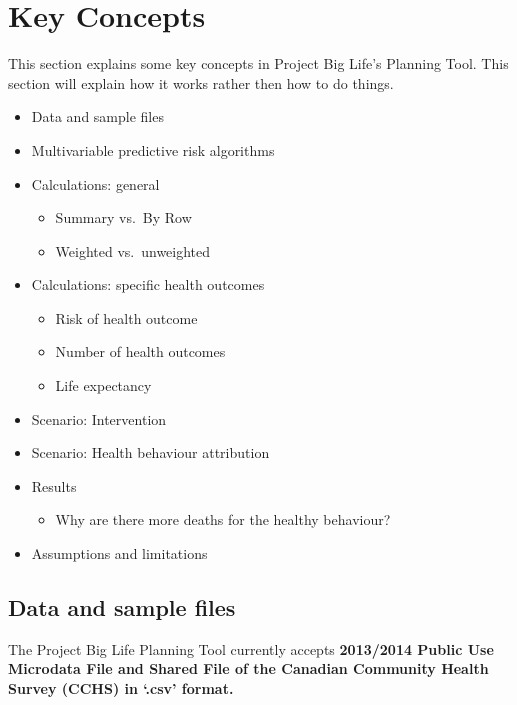 \documentclass[]{book}
\providecommand{\tightlist}{%
  \setlength{\itemsep}{0pt}\setlength{\parskip}{0pt}}
\begin{document}
\hypertarget{keyconcepts}{%
\chapter{Key Concepts}\label{keyconcepts}}

This section explains some key concepts in Project Big Life's Planning Tool. This section will explain how it works rather then how to do things.

\begin{itemize}
\item
  Data and sample files
\item
  Multivariable predictive risk algorithms
\item
  Calculations: general

  \begin{itemize}
  \tightlist
  \item
    Summary vs.~By Row
  \item
    Weighted vs.~unweighted
  \end{itemize}
\item
  Calculations: specific health outcomes

  \begin{itemize}
  \tightlist
  \item
    Risk of health outcome
  \item
    Number of health outcomes
  \item
    Life expectancy
  \end{itemize}
\item
  Scenario: Intervention
\item
  Scenario: Health behaviour attribution
\item
  Results

  \begin{itemize}
  \tightlist
  \item
    Why are there more deaths for the healthy behaviour?
  \end{itemize}
\item
  Assumptions and limitations
\end{itemize}

\hypertarget{data-and-sample-files}{%
\section{Data and sample files}\label{data-and-sample-files}}

The Project Big Life Planning Tool currently accepts \textbf{2013/2014 Public Use Microdata File and Shared File of the Canadian Community Health Survey (CCHS) in `.csv' format.}
\end{document}
